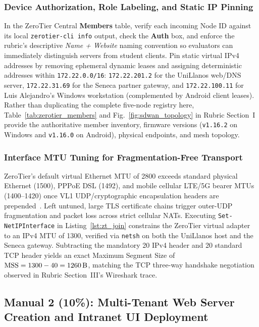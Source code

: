 \subsubsection{Device Authorization, Role Labeling, and Static IP Pinning}
In the ZeroTier Central \textbf{Members} table, verify each incoming Node ID against its local \texttt{zerotier-cli info} output, check the \textbf{Auth} box, and enforce the rubric's descriptive \textit{Name + Website} naming convention so evaluators can immediately distinguish servers from student clients. Pin static virtual IPv4 addresses by removing ephemeral dynamic leases and assigning deterministic addresses within \nolinkurl{172.22.0.0/16}: \nolinkurl{172.22.201.2} for the UniLlanos web/DNS server, \nolinkurl{172.22.31.69} for the Seneca partner gateway, and \nolinkurl{172.22.100.11} for Luis Alejandro's Windows workstation (complemented by Android client leases). Rather than duplicating the complete five-node registry here, Table~\ref{tab:zerotier_members} and Fig.~\ref{fig:sdwan_topology} in Rubric Section~I provide the authoritative member inventory, firmware versions (\texttt{v1.16.2} on Windows and \texttt{v1.16.0} on Android), physical endpoints, and mesh topology.

\subsubsection{Interface MTU Tuning for Fragmentation-Free Transport}
ZeroTier's default virtual Ethernet MTU of \qty{2800}{\byte} exceeds standard physical Ethernet (\qty{1500}{\byte}), PPPoE DSL (\qty{1492}{\byte}), and mobile cellular LTE/5G bearer MTUs (\qtyrange{1400}{1420}{\byte}) once VL1 UDP/cryptographic encapsulation headers are prepended~\cite{zerotier2024,tanenbaum2021}. Left untuned, large TLS certificate chains trigger outer-UDP fragmentation and packet loss across strict cellular NATs. Executing \texttt{Set-NetIPInterface} in Listing~\ref{lst:zt_join} constrains the ZeroTier virtual adapter to an IPv4 MTU of \qty{1300}{\byte}, verified via \texttt{netsh} on both the UniLlanos host and the Seneca gateway. Subtracting the mandatory \qty{20}{\byte} IPv4 header and \qty{20}{\byte} standard TCP header yields an exact Maximum Segment Size of $\text{MSS} = 1300 - 40 = \qty{1260}{\byte}$, matching the TCP three-way handshake negotiation observed in Rubric Section~III's Wireshark trace.

\subsection{Manual 2 (10\%): Multi-Tenant Web Server Creation and Intranet UI Deployment}
\label{subsec:manual2_web}

